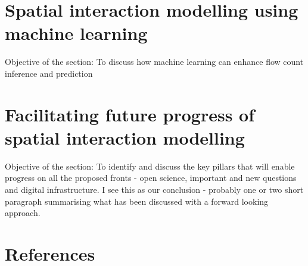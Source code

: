 \documentclass[11pt,letterpaper]{article}
\begin{document}
\hypertarget{spatial-interaction-modelling-using-machine-learning}{%
\section{Spatial interaction modelling using machine learning}\label{spatial-interaction-modelling-using-machine-learning}}

Objective of the section: To discuss how machine learning can enhance flow count inference and prediction

\hypertarget{facilitating-future-progress-of-spatial-interaction-modelling}{%
\section{Facilitating future progress of spatial interaction modelling}\label{facilitating-future-progress-of-spatial-interaction-modelling}}

Objective of the section: To identify and discuss the key pillars that will enable progress on all the proposed fronts - open science, important and new questions and digital infrastructure.
I see this as our conclusion - probably one or two short paragraph summarising what has been discussed with a forward looking approach.

\hypertarget{references}{%
\section*{References}\label{references}}
\end{document}
